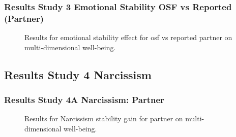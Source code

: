 \documentclass[
  singlecolumn]{article}
\begin{document}
\newpage{}

\subsubsection{Results Study 3 Emotional Stability OSF vs Reported
(Partner)}\label{results-study-3-emotional-stability-osf-vs-reported-partner}

\begin{figure}


\caption{\label{fig-results-emotional-osf-compare}Results for emotional
stability effect for osf vs reported partner on multi-dimensional
well-being.}

\end{figure}%

\newpage{}

\subsection{Results Study 4
Narcissism}\label{results-study-4-narcissism-1}

\subsubsection{Results Study 4A Narcissism:
Partner}\label{results-study-4a-narcissism-partner-1}

\begin{figure}


\caption{\label{fig-results-narcissism-partner-osf}Results for
Narcissism stability gain for partner on multi-dimensional well-being.}

\end{figure}%

\newpage{}
\end{document}
